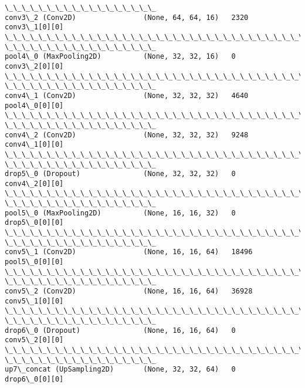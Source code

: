 \documentclass[11pt]{article}
\begin{document}
\begin{Verbatim}[commandchars=\\\{\}]
\_\_\_\_\_\_\_\_\_\_\_\_\_\_\_\_\_\_
conv3\_2 (Conv2D)                (None, 64, 64, 16)   2320        conv3\_1[0][0]
\_\_\_\_\_\_\_\_\_\_\_\_\_\_\_\_\_\_\_\_\_\_\_\_\_\_\_\_\_\_\_\_\_\_\_\_\_\_\_\_\_\_\_\_\_\_\_\_\_\_\_\_\_\_\_\_\_\_\_\_\_\_\_\_\_\_\_\_\_\_\_\_\_\_\_\_\_\_\_\_
\_\_\_\_\_\_\_\_\_\_\_\_\_\_\_\_\_\_
pool4\_0 (MaxPooling2D)          (None, 32, 32, 16)   0           conv3\_2[0][0]
\_\_\_\_\_\_\_\_\_\_\_\_\_\_\_\_\_\_\_\_\_\_\_\_\_\_\_\_\_\_\_\_\_\_\_\_\_\_\_\_\_\_\_\_\_\_\_\_\_\_\_\_\_\_\_\_\_\_\_\_\_\_\_\_\_\_\_\_\_\_\_\_\_\_\_\_\_\_\_\_
\_\_\_\_\_\_\_\_\_\_\_\_\_\_\_\_\_\_
conv4\_1 (Conv2D)                (None, 32, 32, 32)   4640        pool4\_0[0][0]
\_\_\_\_\_\_\_\_\_\_\_\_\_\_\_\_\_\_\_\_\_\_\_\_\_\_\_\_\_\_\_\_\_\_\_\_\_\_\_\_\_\_\_\_\_\_\_\_\_\_\_\_\_\_\_\_\_\_\_\_\_\_\_\_\_\_\_\_\_\_\_\_\_\_\_\_\_\_\_\_
\_\_\_\_\_\_\_\_\_\_\_\_\_\_\_\_\_\_
conv4\_2 (Conv2D)                (None, 32, 32, 32)   9248        conv4\_1[0][0]
\_\_\_\_\_\_\_\_\_\_\_\_\_\_\_\_\_\_\_\_\_\_\_\_\_\_\_\_\_\_\_\_\_\_\_\_\_\_\_\_\_\_\_\_\_\_\_\_\_\_\_\_\_\_\_\_\_\_\_\_\_\_\_\_\_\_\_\_\_\_\_\_\_\_\_\_\_\_\_\_
\_\_\_\_\_\_\_\_\_\_\_\_\_\_\_\_\_\_
drop5\_0 (Dropout)               (None, 32, 32, 32)   0           conv4\_2[0][0]
\_\_\_\_\_\_\_\_\_\_\_\_\_\_\_\_\_\_\_\_\_\_\_\_\_\_\_\_\_\_\_\_\_\_\_\_\_\_\_\_\_\_\_\_\_\_\_\_\_\_\_\_\_\_\_\_\_\_\_\_\_\_\_\_\_\_\_\_\_\_\_\_\_\_\_\_\_\_\_\_
\_\_\_\_\_\_\_\_\_\_\_\_\_\_\_\_\_\_
pool5\_0 (MaxPooling2D)          (None, 16, 16, 32)   0           drop5\_0[0][0]
\_\_\_\_\_\_\_\_\_\_\_\_\_\_\_\_\_\_\_\_\_\_\_\_\_\_\_\_\_\_\_\_\_\_\_\_\_\_\_\_\_\_\_\_\_\_\_\_\_\_\_\_\_\_\_\_\_\_\_\_\_\_\_\_\_\_\_\_\_\_\_\_\_\_\_\_\_\_\_\_
\_\_\_\_\_\_\_\_\_\_\_\_\_\_\_\_\_\_
conv5\_1 (Conv2D)                (None, 16, 16, 64)   18496       pool5\_0[0][0]
\_\_\_\_\_\_\_\_\_\_\_\_\_\_\_\_\_\_\_\_\_\_\_\_\_\_\_\_\_\_\_\_\_\_\_\_\_\_\_\_\_\_\_\_\_\_\_\_\_\_\_\_\_\_\_\_\_\_\_\_\_\_\_\_\_\_\_\_\_\_\_\_\_\_\_\_\_\_\_\_
\_\_\_\_\_\_\_\_\_\_\_\_\_\_\_\_\_\_
conv5\_2 (Conv2D)                (None, 16, 16, 64)   36928       conv5\_1[0][0]
\_\_\_\_\_\_\_\_\_\_\_\_\_\_\_\_\_\_\_\_\_\_\_\_\_\_\_\_\_\_\_\_\_\_\_\_\_\_\_\_\_\_\_\_\_\_\_\_\_\_\_\_\_\_\_\_\_\_\_\_\_\_\_\_\_\_\_\_\_\_\_\_\_\_\_\_\_\_\_\_
\_\_\_\_\_\_\_\_\_\_\_\_\_\_\_\_\_\_
drop6\_0 (Dropout)               (None, 16, 16, 64)   0           conv5\_2[0][0]
\_\_\_\_\_\_\_\_\_\_\_\_\_\_\_\_\_\_\_\_\_\_\_\_\_\_\_\_\_\_\_\_\_\_\_\_\_\_\_\_\_\_\_\_\_\_\_\_\_\_\_\_\_\_\_\_\_\_\_\_\_\_\_\_\_\_\_\_\_\_\_\_\_\_\_\_\_\_\_\_
\_\_\_\_\_\_\_\_\_\_\_\_\_\_\_\_\_\_
up7\_concat (UpSampling2D)       (None, 32, 32, 64)   0           drop6\_0[0][0]

\end{Verbatim}
\end{document}
